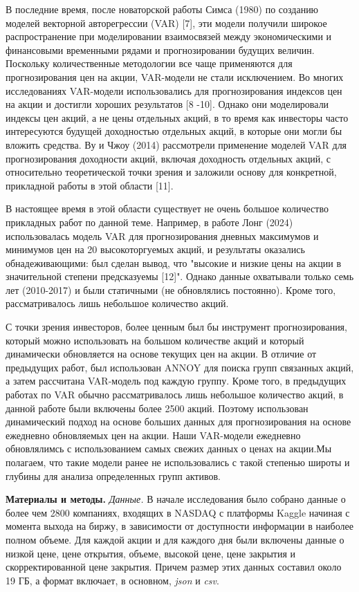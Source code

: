 \begin{multicols}{2}
В последние время, после новаторской работы Симса (1980) по созданию
моделей векторной авторегрессии (VAR) {[}7{]}, эти модели получили
широкое распространение при моделировании взаимосвязей между
экономическими и финансовыми временными рядами и прогнозировании будущих
величин. Поскольку количественные методологии все чаще применяются для
прогнозирования цен на акции, VAR-модели не стали исключением. Во многих
исследованиях VAR-модели использовались для прогнозирования индексов цен
на акции и достигли хороших результатов {[}8 -10{]}. Однако они
моделировали индексы цен акций, а не цены отдельных акций, в то время
как инвесторы часто интересуются будущей доходностью отдельных акций, в
которые они могли бы вложить средства. Ву и Чжоу (2014) рассмотрели
применение моделей VAR для прогнозирования доходности акций, включая
доходность отдельных акций, с относительно теоретической точки зрения и
заложили основу для конкретной, прикладной работы в этой области
{[}11{]}.

В настоящее время в этой области существует не очень большое количество
прикладных работ по данной теме. Например, в работе Лонг (2024)
использовалась модель VAR для прогнозирования дневных максимумов и
минимумов цен на 20 высокоторгуемых акций, и результаты оказались
обнадеживающими: был сделан вывод, что "высокие и низкие цены на акции в
значительной степени предсказуемы {[}12{]}". Однако данные охватывали
только семь лет (2010-2017) и были статичными (не обновлялись
постоянно). Кроме того, рассматривалось лишь небольшое количество акций.

С точки зрения инвесторов, более ценным был бы инструмент
прогнозирования, который можно использовать на большом количестве акций
и который динамически обновляется на основе текущих цен на акции. В
отличие от предыдущих работ, был использован ANNOY для поиска групп
связанных акций, а затем рассчитана VAR-модель под каждую группу. Кроме
того, в предыдущих работах по VAR обычно рассматривалось лишь небольшое
количество акций, в данной работе были включены более 2500 акций.
Поэтому использован динамический подход на основе больших данных для
прогнозирования на основе ежедневно обновляемых цен на акции. Наши
VAR-модели ежедневно обновлялимсь с использованием самых свежих данных о
ценах на акции.Мы полагаем, что такие модели ранее не использовались с
такой степенью широты и глубины для анализа определенных групп активов.

{\bfseries Материалы и методы.} \emph{Данные.} В начале исследования было
собрано данные о более чем 2800 компаниях, входящих в NASDAQ с платформы
Kaggle начиная с момента выхода на биржу, в зависимости от доступности
информации в наиболее полном объеме. Для каждой акции и для каждого дня
были включены данные о низкой цене, цене открытия, объеме, высокой цене,
цене закрытия и скорректированной цене закрытия. Причем размер этих
данных составил около 19 ГБ, а формат включает, в основном, \emph{json}
и \emph{csv}.


\end{multicols}
